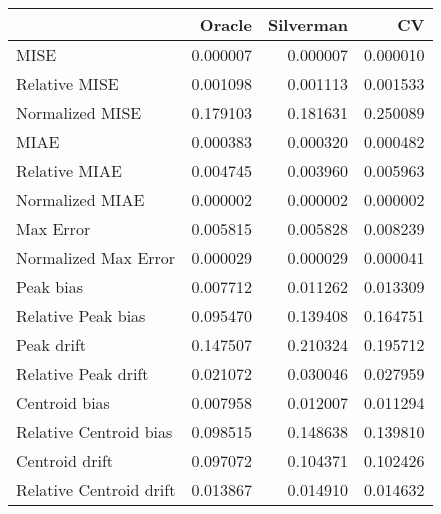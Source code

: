 \begin{tabular}{lrrr}
  \hline
 & Oracle & Silverman & CV \\ 
  \hline
MISE & 0.000007 & 0.000007 & 0.000010 \\ 
  Relative MISE & 0.001098 & 0.001113 & 0.001533 \\ 
  Normalized MISE & 0.179103 & 0.181631 & 0.250089 \\ 
  MIAE & 0.000383 & 0.000320 & 0.000482 \\ 
  Relative MIAE & 0.004745 & 0.003960 & 0.005963 \\ 
  Normalized MIAE & 0.000002 & 0.000002 & 0.000002 \\ 
  Max Error & 0.005815 & 0.005828 & 0.008239 \\ 
  Normalized Max Error & 0.000029 & 0.000029 & 0.000041 \\ 
  Peak bias & 0.007712 & 0.011262 & 0.013309 \\ 
  Relative Peak bias & 0.095470 & 0.139408 & 0.164751 \\ 
  Peak drift & 0.147507 & 0.210324 & 0.195712 \\ 
  Relative Peak drift & 0.021072 & 0.030046 & 0.027959 \\ 
  Centroid bias & 0.007958 & 0.012007 & 0.011294 \\ 
  Relative Centroid bias & 0.098515 & 0.148638 & 0.139810 \\ 
  Centroid drift & 0.097072 & 0.104371 & 0.102426 \\ 
  Relative Centroid drift & 0.013867 & 0.014910 & 0.014632 \\ 
   \hline
\end{tabular}
